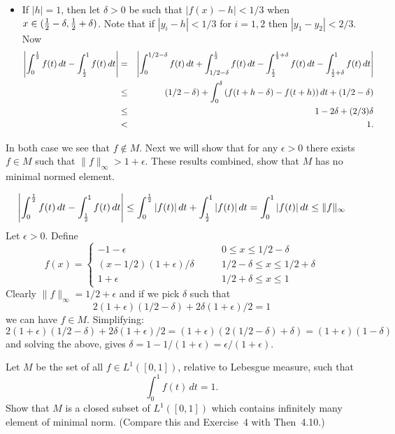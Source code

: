 \begin{enumerate}
\begin{itemize}
\item
If \(|h|=1\), then let \(\delta>0\) be such that \(|f(x)-h| < 1/3\)
when \(x\in (\frac{1}{2}-\delta,\frac{1}{2}+\delta)\).
Note that if \(|y_i-h|<1/3\) for \(i=1,2\) then \(|y_1-y_2| < 2/3\).
Now
\begin{eqnarray*}
\left|\int_0^{\frac{1}{2}} f(t)\,dt - \int_{\frac{1}{2}}^1 f(t)\,dt\right|
&=&
\left|\int_0^{1/2-\delta} f(t)\,dt
+ \int_{1/2-\delta}^{\frac{1}{2}} f(t)\,dt
- \int_{\frac{1}{2}}^{\frac{1}{2}+\delta} f(t)\,dt
- \int_{\frac{1}{2}+\delta}^1 f(t)\,dt\right| \\
&\leq& (1/2 - \delta)
       + \int_0^\delta \left(f(t+h-\delta) - f(t+h)\right)dt
       + (1/2 - \delta) \\
&\leq& 1 - 2\delta + (2/3)\delta \\
&<& 1.
\end{eqnarray*}
\end{itemize}
In both case we see that \(f\notin M\).
Next we will show that for any \(\epsilon>0\) there exists \(f\in M\)
such that \(\|f\|_\infty > 1 + \epsilon\).
These results combined, show that $M$ has no minimal normed element.


\[
\left|\int_0^{\frac{1}{2}} f(t)\,dt - \int_{\frac{1}{2}}^1 f(t)\,dt\right|
\leq \int_0^{\frac{1}{2}} |f(t)|\,dt + \int_{\frac{1}{2}}^1 |f(t)|\,dt
= \int_0^1 |f(t)|\,dt \leq \|f\|_\infty
\]
Let \(\epsilon>0\). Define
\[
f(x) = \left\{
       \begin{array}{ll}
       -1 - \epsilon& \qquad 0\leq x \leq 1/2 - \delta \\
        (x-1/2) (1+\epsilon)/\delta
                        & \qquad 1/2 - \delta \leq x \leq 1/2 + \delta \\
       1 + \epsilon  & \qquad 1/2 + \delta \leq x \leq 1
       \end{array}\right.
\]
Clearly \(\|f\|_\infty = 1/2+\epsilon\) and if we pick
\(\delta\) such that
\[2(1+\epsilon)(1/2 - \delta) + 2\delta(1+\epsilon)/2 = 1\]
we can have \(f\in M\).
Simplifying:
\[2(1+\epsilon)(1/2 - \delta) + 2\delta(1+\epsilon)/2
  = (1+\epsilon)(2(1/2 - \delta) + \delta)
  = (1+\epsilon)(1 - \delta)\]
and solving the above,
gives \(\delta = 1 - 1/(1+\epsilon) = \epsilon/(1+\epsilon)\).



\begin{excopy}
Let $M$ be the set of all \(f\in L^1([0,1])\), relative to Lebesgue measure,
such that
\[\int_0^1 f(t)\,dt = 1.\]
Show that $M$ is a closed subset of  \(L^1([0,1])\) which contains
infinitely many element of minimal norm.
(Compare this and Exercise~4 with Then~4.10.)
\end{excopy}


\end{enumerate}

